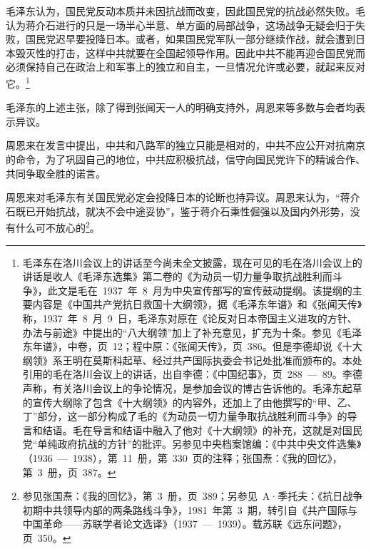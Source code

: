 毛泽东认为，国民党反动本质并未因抗战而改变，因此国民党的抗战必然失败。毛认为蒋介石进行的只是一场半心半意、单方面的局部战争，这场战争无疑会归于失败，国民党迟早要投降日本。或者，如果国民党军队一部分继续作战，就会遭到日本毁灭性的打击，这样中共就要在全国起领导作用。因此中共不能再迎合国民党而必须保持自己在政治上和军事上的独立和自主，一旦情况允许或必要，就起来反对它。\footnote{毛泽东在洛川会议上的讲话至今尚未全文披露，现在可见的毛在洛川会议上的讲话是收人《毛泽东选集》第二卷的《为动员一切力量争取抗战胜利而斗争》，此文是毛在~1937~年~8~月为中央宣传部写的宣传鼓动提纲。该提纲的主要内容是《中国共产党抗日救国十大纲领》，据《毛泽东年谱》和《张闻天传》称，1937~年~8~月~9~日，毛泽东对原在《论反对日本帝国主义进攻的方针、办法与前途》中提出的“八大纲领”加上了补充意见，扩充为十条。参见《毛泽东年谱》，中卷，页~12；程中原：《张闻天传》，页~386。但是李德却说《十大纲领》系王明在莫斯科起草、经过共产国际执委会书记处批准而颁布的。本处引用的毛在洛川会议上的讲话，出自李德：《中国纪事》，页~288~—~89。李德声称，有关洛川会议上的争论情况，是参加会议的博古告诉他的。毛泽东起草的宣传大纲除了包含《十大纲领》的内容外，还加上了由他撰写的“甲、乙、丁”部分，这一部分构成了毛的《为动员一切力量争取抗战胜利而斗争》的导言和结语。毛在导言和结语中融入了他对《十大纲领》的补充，这就是对国民党“单纯政府抗战的方针”的批评。另参见中央档案馆编：《中共中央文件选集》（1936~—~1938），第~11~册，第~330~页的注释；张国焘：《我的回忆》，第~3~册，页~387。}

毛泽东的上述主张，除了得到张闻天一人的明确支持外，周恩来等多数与会者均表示异议。

周恩来在发言中提出，中共和八路军的独立只能是相对的，中共不应公开对抗南京的命令，为了巩固自己的地位，中共应积极抗战，信守向国民党许下的精诚合作、共同争取全胜的诺言。

周恩来对毛泽东有关国民党必定会投降日本的论断也持异议。周恩来认为，“蒋介石既已开始抗战，就决不会中途妥协”，鉴于蒋介石秉性倔强以及国内外形势，没有什么可不放心的\footnote{参见张国焘：《我的回忆》，第~3~册，页~389；另参见~A·季托夫：《抗日战争初期中共领导内部的两条路线斗争》，1981~年第~3~期，转引自《共产国际与中国革命——苏联学者论文选译》（1937~—~1939）。载苏联《远东问题》，页~350。}。

